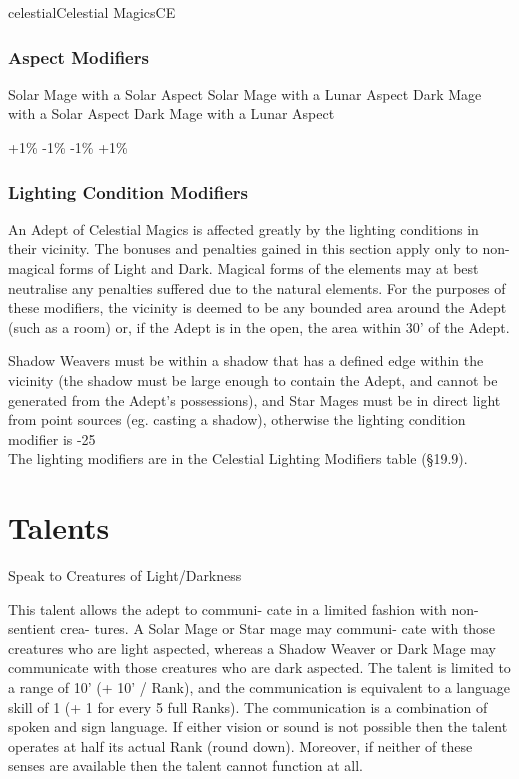 \begin{College}[1.3]{celestial}{Celestial Magics}{CE}
\subsubsection{Aspect Modifiers}

Solar Mage with a Solar Aspect 
Solar Mage with a Lunar Aspect 
Dark Mage with a Solar Aspect 
Dark Mage with a Lunar Aspect 

+1\%  
-1\%  
-1\%  
+1\% 

\subsubsection{Lighting Condition Modifiers}

An Adept of Celestial Magics is affected greatly by the lighting
conditions in their vicinity.  The bonuses and penalties gained in
this section apply only to non-magical forms of Light and Dark.
Magical forms of the elements may at best neutralise any penalties
suffered due to the natural elements.  For the purposes of these
modifiers, the vicinity is deemed to be any bounded area around the
Adept (such as a room) or, if the Adept is in the open, the area
within 30’ of the Adept.

Shadow Weavers must be within a shadow that has a defined edge within
the vicinity (the shadow must be large enough to contain the Adept,
and cannot be generated from the Adept’s possessions), and Star Mages
must be in direct light from point sources (eg. casting a shadow),
otherwise the lighting condition modifier is -25\\%

The lighting modifiers are in the Celestial Lighting Modifiers table
(§19.9).

\section{Talents}

\begin{talent}[T-1]{Speak to Creatures of Light/Darkness}

\begin{effects}
 This  talent  allows  the  adept  to  communi-
cate  in  a  limited  fashion  with  non-sentient  crea-
tures.  A  Solar  Mage  or  Star  mage  may  communi-
cate  with  those  creatures  who  are  light  aspected, 
whereas  a  Shadow  Weaver  or  Dark  Mage  may 
communicate  with  those  creatures  who  are  dark 
aspected.  The talent is limited to a range of 10’ (+ 
10’  /  Rank),  and  the  communication  is  equivalent 
to a language skill of 1 (+ 1 for every 5 full Ranks). 
The  communication  is  a  combination  of  spoken 
and  sign  language.  If  either  vision  or  sound is  not 
possible  then  the  talent  operates  at  half  its  actual 
Rank  (round  down).  Moreover,  if  neither  of  these 
senses are available then the talent cannot function 
at all. 
\end{effects}
\end{talent}


\end{College}
